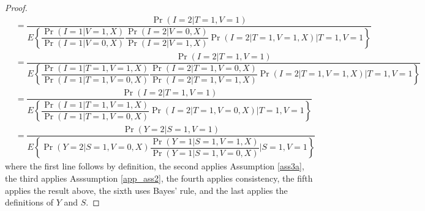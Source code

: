 \begin{appendix}
\begin{refsection}
\begin{proof}
\begin{align*}
            &= \dfrac{\Pr(I = 2 | T = 1, V = 1)}{E\left\{\dfrac{\Pr(I = 1| V = 1, X)}{\Pr(I = 1| V = 0, X)}\dfrac{\Pr(I = 2 | V = 0, X)}{\Pr(I = 2 | V = 1, X)}\Pr(I = 2| T = 1, V = 1, X)\Big| T = 1, V = 1\right\}} \\
            &= \dfrac{\Pr(I = 2 | T = 1, V = 1)}{E\left\{\dfrac{\Pr(I = 1|T=1, V = 1, X)}{\Pr(I = 1|T = 1, V = 0, X)}\dfrac{\Pr(I = 2 | T = 1, V = 0, X)}{\Pr(I = 2 | T = 1, V = 1, X)}\Pr(I = 2| T = 1, V = 1, X)\Big| T = 1, V = 1\right\}} \\
            &= \dfrac{\Pr(I = 2 | T = 1, V = 1)}{E\left\{\dfrac{\Pr(I = 1|T=1, V = 1, X)}{\Pr(I = 1|T = 1, V = 0, X)}\Pr(I = 2 | T = 1, V = 0, X)\Big| T = 1, V = 1\right\}} \\
            &= \dfrac{\Pr(Y = 2 | S = 1, V = 1)}{E\left\{ \Pr(Y = 2 | S = 1, V = 0, X) \dfrac{\Pr(Y = 1 | S = 1, V = 1, X)}{\Pr(Y = 1| S = 1, V = 0, X)}\Big| S = 1, V = 1 \right\}}
        \end{align*}
        where the first line follows by definition, the second applies Assumption \ref{ass3a}, the third applies Asssumption \ref{app_ass2}, the fourth applies consistency, the fifth applies the result above, the sixth uses Bayes' rule, and the last applies the definitions of $Y$ and $S$.
        
    \end{proof}
    \newpage


    
   
    


\end{refsection}
\end{appendix}
